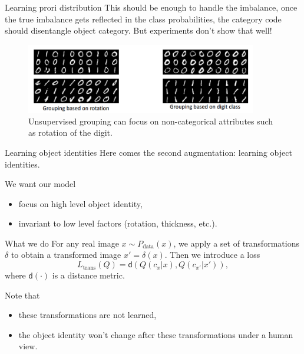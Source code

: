 \documentclass[xcolor={svgnames}]{beamer}
\begin{document}

\begin{frame}{Learning prori distribution}
  This should be enough to handle the imbalance, once the true imbalance gets
  reflected in the class probabilities, the category code should disentangle
  object category. But experiments don't show that well!
  
  \begin{figure}[hp]
    \centering
    \includegraphics[width=0.9\textwidth]{figures/disentangle.png}
    \caption{Unsupervised grouping can focus on non-categorical attributes 
    such as rotation of the digit.}
    \label{fig:dis}
  \end{figure}

\end{frame}


\begin{frame}{Learning object identities}
  Here comes the second augmentation: \alert{learning object identities}. 

  We want our model
  \begin{itemize}
    \item focus on high level object identity,
    \item invariant to low level factors (rotation, thickness, etc.).
  \end{itemize}
\end{frame}


\begin{frame}{What we do}
  For any real image $x \sim P_{\text{data}}(x)$, we apply a set of
  transformations $\delta$ to obtain a transformed image $x' = \delta(x)$.
  Then we introduce a loss
  \[
    L_{\text{trans}}(Q) = \mathsf{d}(Q(c_x | x), Q(c_{x'} | x')),
  \]
  where $\mathsf{d}(\cdot)$ is a distance metric.

  Note that
  \begin{itemize}
    \item these transformations are not learned,
    \item the object identity won't change after these transformations under
      a human view.
  \end{itemize}
\end{frame}
\end{document}
